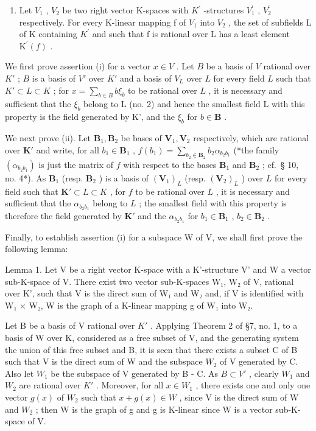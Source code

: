 \begin{enumerate}
\def\labelenumi{(\roman{enumi})}
\setcounter{enumi}{1}
\tightlist
\item
  Let \(V_{1}\) , \(V_{2}\) be two right vector K-spaces with \(K^{\prime}\) -structures \(V_{1}^{\prime}\) , \(V_{2}^{\prime}\) respectively. For every K-linear mapping f of \(V_{1}\) into \(V_{2}\) , the set of subfields L of K containing \(K^{\prime}\) and such that f is rational over L has a least element \(\mathrm{K}^{\prime}(f)\) .
\end{enumerate}

We first prove assertion (i) for a vector \(x \in V\) . Let \(B\) be a basis of \(V\) rational over \(K'\) ; \(B\) is a basis of \(V'\) over \(K'\) and a basis of \(V_L\) over \(L\) for every field \(L\) such that \(K' \subset L \subset K\) ; for \(x = \sum_{b \in B} b\xi_b\) to be rational over \(L\) , it is necessary and sufficient that the \(\xi_{b}\) belong to L (no. 2) and hence the smallest field L with this property is the field generated by K', and the \(\xi_{b}\) for \(b \in \mathbf{B}\) .

We next prove (ii). Let \(\mathbf{B}_1, \mathbf{B}_2\) be bases of \(\mathbf{V}_1, \mathbf{V}_2\) respectively, which are rational over \(\mathbf{K}'\) and write, for all \(b_1 \in \mathbf{B}_1\) , \(f(b_1) = \sum_{b_2 \in \mathbf{B}_2} b_2 \alpha_{b_2 b_1}\) (*the family \((\alpha_{b_2 b_1})\) is just the matrix of \(f\) with respect to the bases \(\mathbf{B}_1\) and \(\mathbf{B}_2\) ; cf.~§ 10, no. 4*). As \(\mathbf{B}_1\) (resp. \(\mathbf{B}_2\) ) is a basis of \((\mathbf{V}_1)_L\) (resp. \((\mathbf{V}_2)_L\) ) over \(L\) for every field such that \(\mathbf{K}' \subset L \subset K\) , for \(f\) to be rational over \(L\) , it is necessary and sufficient that the \(\alpha_{b_2 b_1}\) belong to \(L\) ; the smallest field with this property is therefore the field generated by \(\mathbf{K}'\) and the \(\alpha_{b_2 b_1}\) for \(b_1 \in \mathbf{B}_1\) , \(b_2 \in \mathbf{B}_2\) .

Finally, to establish assertion (i) for a subspace W of V, we shall first prove the following lemma:

Lemma 1. Let V be a right vector K-space with a K'-structure V' and W a vector sub-K-space of V. There exist two vector sub-K-spaces W₁, W₂ of V, rational over K', such that V is the direct sum of W₁ and W₂ and, if V is identified with W₁ × W₂, W is the graph of a K-linear mapping g of W₁ into W₂.

Let B be a basis of V rational over \(K'\) . Applying Theorem 2 of §7, no. 1, to a basis of W over K, considered as a free subset of V, and the generating system the union of this free subset and B, it is seen that there exists a subset C of B such that V is the direct sum of W and the subspace \(W_{2}\) of V generated by C. Also let \(W_{1}\) be the subspace of V generated by B - C. As \(B \subset V'\) , clearly \(W_{1}\) and \(W_{2}\) are rational over \(K'\) . Moreover, for all \(x \in W_{1}\) , there exists one and only one vector \(g(x)\) of \(W_{2}\) such that \(x + g(x) \in W\) , since V is the direct sum of W and \(W_{2}\) ; then W is the graph of g and g is K-linear since W is a vector sub-K-space of V.

